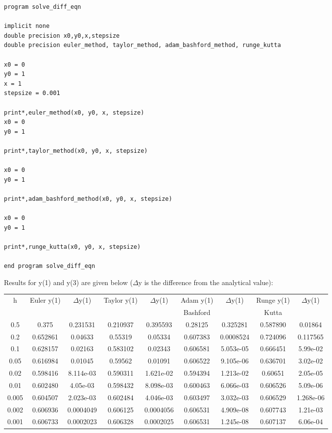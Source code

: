 \documentclass[a4paper,10pt]{article}
\begin{document}
\begin{lstlisting}[language={[77]Fortran}]
program solve_diff_eqn

implicit none
double precision x0,y0,x,stepsize
double precision euler_method, taylor_method, adam_bashford_method, runge_kutta

x0 = 0
y0 = 1
x = 1
stepsize = 0.001

print*,euler_method(x0, y0, x, stepsize)
x0 = 0
y0 = 1

print*,taylor_method(x0, y0, x, stepsize)

x0 = 0
y0 = 1

print*,adam_bashford_method(x0, y0, x, stepsize)

x0 = 0
y0 = 1

print*,runge_kutta(x0, y0, x, stepsize)

end program solve_diff_eqn

\end{lstlisting}
\newpage

Results for y(1) and y(3) are given below ($\Delta$y is the difference from the analytical value):

\begin{center}
\begin{longtable}{|| c || c c || c c || c c || c c ||}
\hline
h & Euler y(1) & $\Delta$y(1) & Taylor y(1) & $\Delta$y(1) & Adam y(1) & $\Delta$y(1) & Runge y(1) & $\Delta$y(1) \\
 & & & & & Bashford & & Kutta & \\
\hline
0.5 & 0.375 & 0.231531 & 0.210937 & 0.395593 & 0.28125 & 0.325281 & 0.587890 & 0.01864 \\
0.2 & 0.652861 & 0.04633 & 0.55319 & 0.05334 & 0.607383 & 0.0008524 & 0.724096 & 0.117565 \\
0.1 & 0.628157 & 0.02163 & 0.583102 & 0.02343 & 0.606581 & 5.053e-05 & 0.666451 & 5.99e-02 \\
0.05 & 0.616984 & 0.01045 & 0.59562 & 0.01091 & 0.606522 & 9.105e-06 & 0.636701 & 3.02e-02 \\
0.02 & 0.598416 & 8.114e-03 & 0.590311 & 1.621e-02 & 0.594394 & 1.213e-02 & 0.60651 & 2.05e-05 \\
0.01 & 0.602480 & 4.05e-03 & 0.598432 & 8.098e-03 & 0.600463 & 6.066e-03 & 0.606526 & 5.09e-06 \\
0.005 & 0.604507 & 2.023e-03 & 0.602484 & 4.046e-03 & 0.603497 & 3.032e-03 & 0.606529 & 1.268e-06 \\
0.002 & 0.606936 & 0.0004049 & 0.606125 & 0.0004056 & 0.606531 & 4.909e-08 & 0.607743 & 1.21e-03 \\
0.001 & 0.606733 & 0.0002023 & 0.606328 & 0.0002025 & 0.606531 & 1.245e-08 & 0.607137 & 6.06e-04 \\
\hline
\end{longtable}
\end{center}
\end{document}

